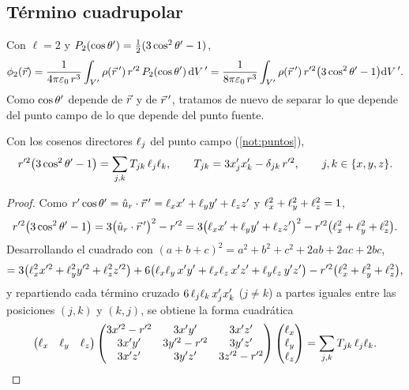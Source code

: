 \subsection{Término cuadrupolar}\label{sec:cuadrupolar}
Con $\ell=2$ y $P_{2}(\cos\theta')=\frac12(3\cos^{2}\theta'-1)$,
\begin{equation}\label{eq:cuadrupolar-integral}
  \phi_{2}(\vec{r})=\frac{1}{4\pi\varepsilon_{0}\,r^{3}}\int_{V'}\rho(\vec{r}\,')\,r'^{2}\,P_{2}(\cos\theta')\,\mathrm{d} V\,'=\frac{1}{8\pi\varepsilon_{0}\,r^{3}}\int_{V'}\rho(\vec{r}\,')\,r'^{2}\bigl(3\cos^{2}\theta'-1\bigr)\mathrm{d} V\,' .
\end{equation}
Como $\cos\theta'$ depende de $\vec{r}$ y de $\vec{r}\,'$, tratamos de nuevo de separar lo que depende del punto campo de lo que depende del punto fuente.

\begin{lema}\label{lem:separacion}
Con los cosenos directores $\ell_{j}$ del punto campo (\cref{not:puntos}),
\begin{equation}\label{eq:separacion}
  r'^{2}\bigl(3\cos^{2}\theta'-1\bigr)=\sum_{j,k}T_{jk}\,\ell_{j}\ell_{k},\qquad T_{jk}=3x'_jx'_k-\delta_{jk}\,r'^{2},\qquad j,k\in\{x,y,z\}.
\end{equation}
\end{lema}
\begin{proof}
Como $r'\cos\theta'=\hat{u}_{r}\cdot\vec{r}\,'=\ell_{x}x'+\ell_{y}y'+\ell_{z}z'$ y $\ell_{x}^{2}+\ell_{y}^{2}+\ell_{z}^{2}=1$,
\[
  r'^{2}\bigl(3\cos^{2}\theta'-1\bigr)=3\bigl(\hat{u}_{r}\cdot\vec{r}\,'\bigr)^{2}-r'^{2}=3\bigl(\ell_{x}x'+\ell_{y}y'+\ell_{z}z'\bigr)^{2}-r'^{2}\bigl(\ell_{x}^{2}+\ell_{y}^{2}+\ell_{z}^{2}\bigr).
\]
Desarrollando el cuadrado con $(a+b+c)^{2}=a^{2}+b^{2}+c^{2}+2ab+2ac+2bc$,
\[
  =3\bigl(\ell_{x}^{2}x'^{2}+\ell_{y}^{2}y'^{2}+\ell_{z}^{2}z'^{2}\bigr)+6\bigl(\ell_{x}\ell_{y}\,x'y'+\ell_{x}\ell_{z}\,x'z'+\ell_{y}\ell_{z}\,y'z'\bigr)-r'^{2}\bigl(\ell_{x}^{2}+\ell_{y}^{2}+\ell_{z}^{2}\bigr),
\]
y repartiendo cada término cruzado $6\,\ell_{j}\ell_{k}\,x'_jx'_k$ ($j\neq k$) a partes iguales entre las posiciones $(j,k)$ y $(k,j)$, se obtiene la forma cuadrática
\[
  \begin{pmatrix}\ell_{x}&\ell_{y}&\ell_{z}\end{pmatrix}
  \begin{pmatrix}3x'^{2}-r'^{2}&3x'y'&3x'z'\\ 3x'y'&3y'^{2}-r'^{2}&3y'z'\\ 3x'z'&3y'z'&3z'^{2}-r'^{2}\end{pmatrix}
  \begin{pmatrix}\ell_{x}\\ \ell_{y}\\ \ell_{z}\end{pmatrix}=\sum_{j,k}T_{jk}\,\ell_{j}\ell_{k}.\qedhere
\]
\end{proof}

